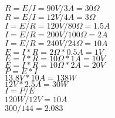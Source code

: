 \documentclass{article}
\begin{document}
\thispagestyle{empty}

$ R = E / I = 90 V / 3 A = 30 \Omega $ \\
$ R = E / I = 12 V / 4 A = 3 \Omega $ \\
$ I = E / R = 120 V / 80 \Omega = 1.5 A $ \\
$ I = E / R = 200 V / 100 \Omega = 2 A $ \\
$ I = E / R = 240 V / 24 \Omega = 10 A $ \\
$ E = I * R = 2 \Omega * 0.5 A = 1 V $ \\
$ E = I * R = 10 \Omega * 1 A = 10 V $ \\
$ E = I * R = 10 \Omega * 2 A = 20 V $ \\

$ P = E * I $ \\
$ 13.8 V * 10 A = 138 W $ \\
$ 12 V * 2.5 A = 30 W $ \\
$ I = P / E $ \\
$ 120 W / 12 V = 10 A $ \\
$ 300 / 144 = 2.083 $
\end{document}
